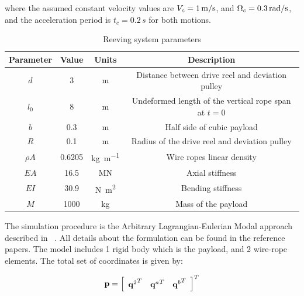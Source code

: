 \setlength{\parindent}{0cm}
where the assumed constant velocity values are $V_c = 1\, {\rm{m}}/{{\rm{s}}}$, and $\Omega_c = 0.3\, {\rm{rad}}/{{\rm{s}}}$, and the acceleration period is $t_c = 0.2 \,s$ for both motions.

\begin{table}[tbph]
    \caption{Reeving system parameters} \label{tab:reeving_system_parameters}
    \centering
    \begin{tabular}{c|c|c|c} \hline
        Parameter & Value & Units & Description \\ \hline
        $d$ & 
            3 & \si{\meter} & 
            Distance between drive reel and deviation pulley \\
        $l_0$ & 
            8 & \si{\meter} & 
            Undeformed length of the vertical rope span at $t = 0$ \\
        $b$ & 
            0.3 & \si{\meter} & 
            Half side of cubic payload \\
        $R$ & 
            \num{0.1} & \si{\meter} & 
            Radius of the drive reel and deviation pulley \\
        $\rho A$ & 
            \num{0.6205} & \si{\kilo\gram\per\meter} & 
            Wire ropes linear density \\
        $EA$ & 
            \num{16.5} & \si{\mega\newton} & 
            Axial stiffness \\
        $EI$ & 
            \num{30.9} & \si{\newton\meter\squared} & 
            Bending stiffness \\
        $M$ & 
            1000 & \si{\kilo\gram} & 
            Mass of the payload \\ \hline
    \end{tabular}
\end{table}

The simulation procedure is the Arbitrary Lagrangian-Eulerian Modal approach described in ~\cite{Escalona2017, EscalonaOrzechowskiMikkola2018, Escalona2022}. All details about the formulation can be found in the reference papers. The model includes 1 rigid body which is the payload, and 2 wire-rope elements. The total set of coordinates is given by:

\begin{equation}
    {{\bf{p}}} = {\left[ {\begin{array}{*{20}{c}}{{\bf{q}}^{2}}^T & {{\bf{q}}^{a}}^T & {{\bf{q}}^{b}}^T \end{array}} \right]^T}
    \label{CoordinateS2}
\end{equation}

